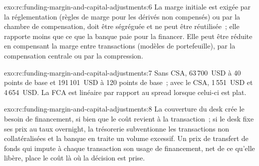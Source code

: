\begin{solution}{exo:rc:funding-margin-and-capital-adjustments:6}
La marge initiale est exigée par la réglementation (règles de marge pour les dérivés non compensés) ou par la chambre de compensation,
doit être ségréguée et ne peut être réutilisée~; elle rapporte moins que ce que la banque paie pour la financer. Elle peut être
réduite en compensant la marge entre transactions (modèles de portefeuille), par la compensation centrale ou par la compression.
\end{solution}

\begin{solution}{exo:rc:funding-margin-and-capital-adjustments:7}
Sans CSA, 63\,700~USD à 40 points de base et 191\,101~USD à 120 points de base~; avec le CSA, 1\,551~USD et 4\,654~USD.
La FCA est linéaire par rapport au spread lorsque celui-ci est plat.
\end{solution}

\begin{solution}{exo:rc:funding-margin-and-capital-adjustments:8}
La couverture du desk crée le besoin de financement, si bien que le coût revient à la transaction~; si le desk
fixe ses prix au taux overnight, la trésorerie subventionne les transactions non collatéralisées et la banque
en traite un volume excessif. Un prix de transfert de fonds qui impute à chaque transaction son usage de financement, net de ce
qu'elle libère, place le coût là où la décision est prise.
\end{solution}

